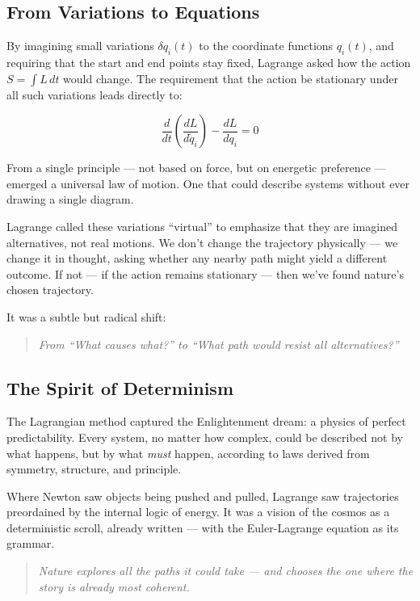 \subsection{From Variations to Equations}

By imagining small variations \( \delta q_i(t) \) to the coordinate functions \( q_i(t) \), and requiring that the start and end points stay fixed, Lagrange asked how the action \( S = \int L\,dt \) would change. The requirement that the action be stationary under all such variations leads directly to:

\[
\frac{d}{dt} \left( \frac{dL}{d\dot{q}_i} \right) - \frac{dL}{dq_i} = 0
\]

From a single principle — not based on force, but on energetic preference — emerged a universal law of motion. One that could describe systems without ever drawing a single diagram.

Lagrange called these variations “virtual” to emphasize that they are imagined alternatives, not real motions. We don’t change the trajectory physically — we change it in thought, asking whether any nearby path might yield a different outcome. If not — if the action remains stationary — then we’ve found nature’s chosen trajectory.

It was a subtle but radical shift:
\begin{quote}
    \textit{From “What causes what?” to “What path would resist all alternatives?”}
\end{quote}

\subsection{The Spirit of Determinism}

The Lagrangian method captured the Enlightenment dream: a physics of perfect predictability. Every system, no matter how complex, could be described not by what happens, but by what \textit{must} happen, according to laws derived from symmetry, structure, and principle.

Where Newton saw objects being pushed and pulled, Lagrange saw trajectories preordained by the internal logic of energy. It was a vision of the cosmos as a deterministic scroll, already written — with the Euler-Lagrange equation as its grammar.

\begin{quote}
    \textit{Nature explores all the paths it could take — and chooses the one where the story is already most coherent.}
\end{quote}



